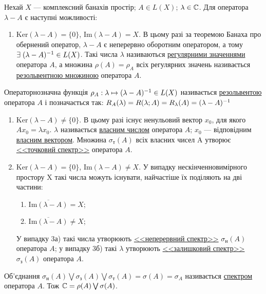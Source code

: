 
\begin{theory}
    Нехай $X$ --- комплексний банахів простір; $A \in L(X)$; $\lambda \in \mathbb{C}$.
    Для оператора $\lambda - A$ є наступні можливості:
    \begin{enumerate}[label=\arabic*)]
        \item ${\mathrm{Ker}(\lambda - A) = \{0\}}$, ${\mathrm{Im}(\lambda - A)} = X$. В цьому разі 
        за теоремою Банаха про обернений оператор, $\lambda - A$ є неперервно оборотним 
        оператором, а тому $\exists \; (\lambda - A)^{-1} \in L(X)$. Такі числа $\lambda$ 
        називаються \ul{регулярними значеннями}  оператора $A$, а множина 
        {$\rho(A) = \rho_A$} всіх регулярних значень називається 
        \ul{резольвентною множиною} оператора $A$.
    \end{enumerate}
    Операторнозначна функція $\rho_A : \lambda \mapsto (\lambda - A)^{-1} \in L(X)$ 
    називається \ul{резольвентою} оператора $A$ і позначається так:
    $R_A(\lambda) = R(\lambda; A) = R_\lambda(A) = (\lambda - A)^{-1}$
    \begin{enumerate}[label=\arabic*), resume]
        \item $\mathrm{Ker}(\lambda - A) \neq \{0\}$. В цьому разі існує ненульовий вектор $x_0$, 
        для якого $Ax_0 = \lambda x_0$. $\lambda$ називається 
        \ul{власним числом} оператора $A$; $x_0$ --- відповідним \ul{власним вектором}.
        Множина $\sigma_\text{т}(A)$ всіх власних чисел A утворює 
        \uline{<<точковий спектр>>} оператора $A$.
        \item $\mathrm{Ker}(\lambda - A) = \{0\}$, $\mathrm{Im}(\lambda - A) \neq X$. 
        У випадку нескінченновимірного простору X такі числа можуть існувати,
        найчастіше їх поділяють на дві частини:
        \begin{enumerate}[label = \ukr*)]
            \item $\overline{\mathrm{Im}(\lambda - A)} = X$;
            \item $\overline{\mathrm{Im}(\lambda - A)} \neq X$;
        \end{enumerate}
        У випадку 3а) такі числа утворюють \uline{<<неперервний спектр>>} {$\sigma_\text{н}(A)$} оператора $A$; у випадку 3б) такі $\lambda$ 
        утворюють \uline{<<залишковий спектр>>} {$\sigma_\text{з}(A)$} оператора $A$. 
    \end{enumerate}
    Об'єднання $\sigma_\text{н}(A) \bigvee \sigma_\text{з}(A) \bigvee \sigma_\text{т}(A) = {\sigma(A) = \sigma_A}$ називається 
    \ul{спектром} оператора $A$. Тож $\mathbb{C} = \rho(A) \bigvee \sigma(A)$.
\end{theory}

